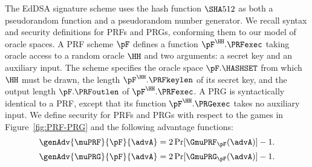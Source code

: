 
 The EdDSA signature scheme uses the hash function $\SHA512$ as both a pseudorandom function and a pseudorandom number generator. We recall syntax and security definitions for PRFs and PRGs, conforming them to our model of oracle spaces. A PRF scheme $\pF$ defines a function $\pF^{\HH}.\PRFexec$ taking oracle access to a random oracle $\HH$ and two arguments: a secret key and an auxiliary input. The scheme specifies the oracle space $\pF.\HASHSET$ from which $\HH$ must be drawn, the length $\pF^{\HH}.\PRFkeylen$ of its secret key, and the output length $\pF.\PRFoutlen$ of $\pF^{\HH}.\PRFexec$. A PRG is syntactically identical to a PRF, except that its function $\pF^{\HH}.\PRGexec$ takes no auxiliary input. 
We define security for PRFs and PRGs with respect to the games in Figure~\ref{fig:PRF-PRG} and the following advantage functions:
\[ \genAdv{\muPRF}{\pF}{\advA} = 2\Pr[\GmuPRF_\pF(\advA)]-1.\]
\[ \genAdv{\muPRG}{\pF}{\advA} = 2\Pr[\GmuPRG_\pF(\advA)]-1.\]

